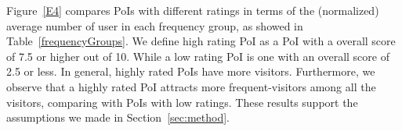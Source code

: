 Figure~\ref{E4} compares PoIs with different ratings in terms of the (normalized) average number of user in each frequency group, as showed in Table~\ref{frequencyGroups}. We define high rating PoI as a PoI with a overall score of 7.5 or higher out of 10. While a low rating PoI is one with an overall score of 2.5 or less. In general, highly rated PoIs have more visitors. Furthermore, we observe that a highly rated PoI attracts more frequent-visitors among all the visitors, comparing with PoIs with low ratings. These results support the assumptions we made in Section~\ref{sec:method}.
